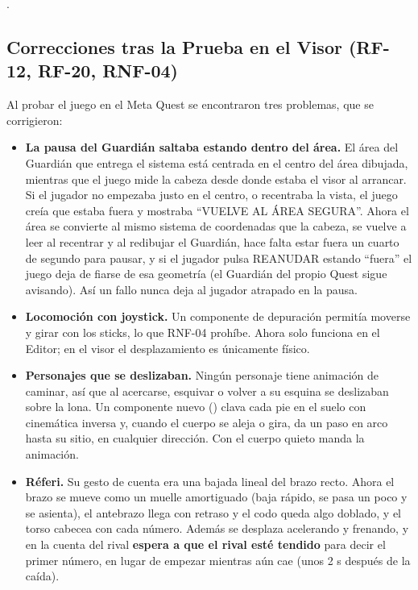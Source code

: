 .

\subsection{Correcciones tras la Prueba en el Visor (RF-12, RF-20, RNF-04)}
\label{sec:correcciones}
Al probar el juego en el Meta Quest se encontraron tres problemas, que se corrigieron:

\begin{itemize}
  \item \textbf{La pausa del Guardián saltaba estando dentro del área.} El área del Guardián que entrega el sistema está centrada en el centro del área dibujada, mientras que el juego mide la cabeza desde donde estaba el visor al arrancar. Si el jugador no empezaba justo en el centro, o recentraba la vista, el juego creía que estaba fuera y mostraba ``VUELVE AL ÁREA SEGURA''. Ahora el área se convierte al mismo sistema de coordenadas que la cabeza, se vuelve a leer al recentrar y al redibujar el Guardián, hace falta estar fuera un cuarto de segundo para pausar, y si el jugador pulsa REANUDAR estando ``fuera'' el juego deja de fiarse de esa geometría (el Guardián del propio Quest sigue avisando). Así un fallo nunca deja al jugador atrapado en la pausa.
  \item \textbf{Locomoción con joystick.} Un componente de depuración permitía moverse y girar con los sticks, lo que RNF-04 prohíbe. Ahora solo funciona en el Editor; en el visor el desplazamiento es únicamente físico.
  \item \textbf{Personajes que se deslizaban.} Ningún personaje tiene animación de caminar, así que al acercarse, esquivar o volver a su esquina se deslizaban sobre la lona. Un componente nuevo () clava cada pie en el suelo con cinemática inversa y, cuando el cuerpo se aleja o gira, da un paso en arco hasta su sitio, en cualquier dirección. Con el cuerpo quieto manda la animación.
  \item \textbf{Réferi.} Su gesto de cuenta era una bajada lineal del brazo recto. Ahora el brazo se mueve como un muelle amortiguado (baja rápido, se pasa un poco y se asienta), el antebrazo llega con retraso y el codo queda algo doblado, y el torso cabecea con cada número. Además se desplaza acelerando y frenando, y en la cuenta del rival \textbf{espera a que el rival esté tendido} para decir el primer número, en lugar de empezar mientras aún cae (unos 2 s después de la caída).
\end{itemize}

